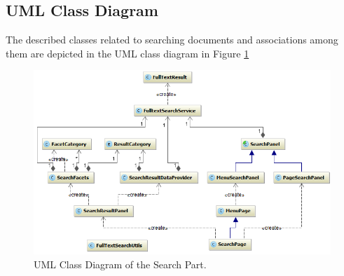 




\subsection{UML Class Diagram}

The described classes related to searching documents and associations among them are depicted in the UML class diagram in Figure \ref{fig:umlDiagramSearching}

\begin{figure}[h]
	\centering
		\includegraphics[width=1.00\textwidth]{figures/diagram_search.png}
	\caption{UML Class Diagram of the Search Part.}
	\label{fig:umlDiagramSearching}
\end{figure}









